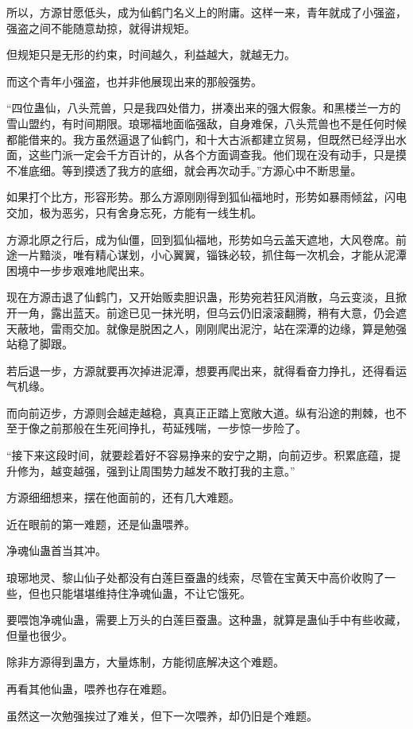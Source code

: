 \begin{this_body}
所以，方源甘愿低头，成为仙鹤门名义上的附庸。这样一来，青年就成了小强盗，强盗之间不能随意劫掠，就得讲规矩。

但规矩只是无形的约束，时间越久，利益越大，就越无力。

而这个青年小强盗，也并非他展现出来的那般强势。

“四位蛊仙，八头荒兽，只是我四处借力，拼凑出来的强大假象。和黑楼兰一方的雪山盟约，有时间期限。琅琊福地面临强敌，自身难保，八头荒兽也不是任何时候都能借来的。我方虽然逼退了仙鹤门，和十大古派都建立贸易，但既然已经浮出水面，这些门派一定会千方百计的，从各个方面调查我。他们现在没有动手，只是摸不准底细。等到摸透了我方的底细，就会再次动手。”方源心中不断思量。

如果打个比方，形容形势。那么方源刚刚得到狐仙福地时，形势如暴雨倾盆，闪电交加，极为恶劣，只有舍身忘死，方能有一线生机。

方源北原之行后，成为仙僵，回到狐仙福地，形势如乌云盖天遮地，大风卷席。前途一片黯淡，唯有精心谋划，小心翼翼，锱铢必较，抓住每一次机会，才能从泥潭困境中一步步艰难地爬出来。

现在方源击退了仙鹤门，又开始贩卖胆识蛊，形势宛若狂风消散，乌云变淡，且掀开一角，露出蓝天。前途已见一抹光明，但乌云仍旧滚滚翻腾，稍有大意，仍会遮天蔽地，雷雨交加。就像是脱困之人，刚刚爬出泥泞，站在深潭的边缘，算是勉强站稳了脚跟。

若后退一步，方源就要再次掉进泥潭，想要再爬出来，就得看奋力挣扎，还得看运气机缘。

而向前迈步，方源则会越走越稳，真真正正踏上宽敞大道。纵有沿途的荆棘，也不至于像之前那般在生死间挣扎，苟延残喘，一步惊一步险了。

“接下来这段时间，就要趁着好不容易挣来的安宁之期，向前迈步。积累底蕴，提升修为，越变越强，强到让周围势力越发不敢打我的主意。”

方源细细想来，摆在他面前的，还有几大难题。

近在眼前的第一难题，还是仙蛊喂养。

净魂仙蛊首当其冲。

琅琊地灵、黎山仙子处都没有白莲巨蚕蛊的线索，尽管在宝黄天中高价收购了一些，但也只能堪堪维持住净魂仙蛊，不让它饿死。

要喂饱净魂仙蛊，需要上万头的白莲巨蚕蛊。这种蛊，就算是蛊仙手中有些收藏，但量也很少。

除非方源得到蛊方，大量炼制，方能彻底解决这个难题。

再看其他仙蛊，喂养也存在难题。

虽然这一次勉强挨过了难关，但下一次喂养，却仍旧是个难题。


\end{this_body}

